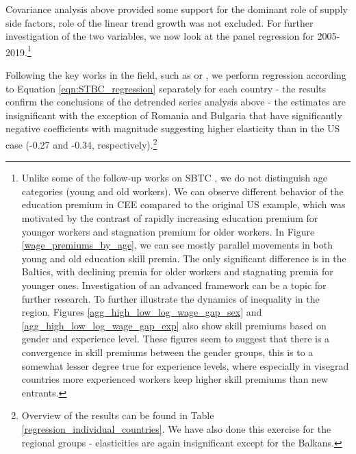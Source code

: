 \documentclass[11pt]{article}
\begin{document}

Covariance analysis above provided some support for the dominant role of supply side factors, role of the linear trend growth was not excluded. For further investigation of the two variables, we now look at the panel regression for 2005-2019.\footnote{Unlike some of the follow-up works on SBTC \citep{card2001can}, we do not distinguish age categories (young and old workers). We can observe different behavior of the education premium in CEE compared to the original US example, which was motivated by the contrast of rapidly increasing education premium for younger workers and stagnation premium for older workers. In Figure \ref{wage_premiums_by_age}, we can see mostly parallel movements in both young and old education skill premia. The only significant difference is in the Baltics, with declining premia for older workers and stagnating premia for younger ones. Investigation of an advanced framework can be a topic for further research. To further illustrate the dynamics of inequality in the region, Figures \ref{agg_high_low_log_wage_gap_sex} and \ref{agg_high_low_log_wage_gap_exp} also show skill premiums based on gender and experience level. These figures seem to suggest that there is a convergence in skill premiums between the gender groups, this is to a somewhat lesser degree true for experience levels, where especially in visegrad countries more experienced workers keep higher skill premiums than new entrants.}   %

Following the key works in the field, such as \citet{katz1992changes} or \citet{acemoglu2012does}, we perform regression according to Equation \ref{eqn:STBC_regression} separately for each country - the results confirm the conclusions of the detrended series analysis above - the estimates are insignificant with the exception of Romania and Bulgaria that have significantly negative coefficients with magnitude suggesting higher elasticity than in the US case (-0.27 and -0.34, respectively).\footnote{Overview of the results can be found in Table \ref{regression_individual_countries}. We have also done this exercise for the regional groups - elasticities are again insignificant except for the Balkans.}
\end{document}
